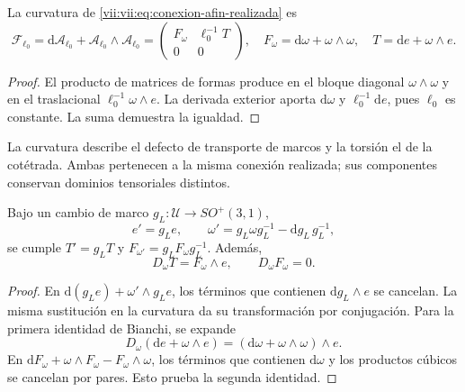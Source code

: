 \begin{proposition}
\label{vii:vii:prop:curvatura-afin}
La curvatura de \eqref{vii:vii:eq:conexion-afin-realizada} es
\begin{equation}
 \mathcal F_{\ell_0}
 =\mathrm d\mathcal A_{\ell_0}
   +\mathcal A_{\ell_0}\wedge\mathcal A_{\ell_0}
 =\begin{pmatrix}F_\omega&\ell_0^{-1}T\\0&0\end{pmatrix},
 \quad F_\omega=\mathrm d\omega+\omega\wedge\omega,
 \quad T=\mathrm de+\omega\wedge e.
 \label{vii:vii:eq:curvatura-afin-realizada}
\end{equation}
\end{proposition}
\begin{proof}
El producto de matrices de formas produce en el bloque diagonal
\(\omega\wedge\omega\) y en el traslacional
\(\ell_0^{-1}\omega\wedge e\). La derivada exterior aporta
\(\mathrm d\omega\) y \(\ell_0^{-1}\mathrm de\), pues
\(\ell_0\) es constante. La suma demuestra la igualdad.
\end{proof}

La curvatura describe el defecto de transporte de marcos y la torsión
el de la cotétrada. Ambas pertenecen a la misma conexión realizada;
sus componentes conservan dominios tensoriales distintos.

\begin{proposition}
\label{vii:vii:prop:bianchi-cartan}
Bajo un cambio de marco \(g_L:\mathcal U\to SO^+(3,1)\),
\[
 e'=g_Le,\qquad
 \omega'=g_L\omega g_L^{-1}-\mathrm dg_L\,g_L^{-1},
\]
se cumple \(T'=g_LT\) y \(F_{\omega'}=g_LF_\omega g_L^{-1}\).
Además,
\begin{equation}
 D_\omega T=F_\omega\wedge e,\qquad D_\omega F_\omega=0.
 \label{vii:vii:eq:bianchi-realizacion}
\end{equation}
\end{proposition}
\begin{proof}
En \(\mathrm d(g_Le)+\omega'\wedge g_Le\), los términos
que contienen \(\mathrm dg_L\wedge e\) se cancelan.
La misma sustitución en la curvatura da su transformación por
conjugación. Para la primera identidad de Bianchi, se expande
\[
 D_\omega(\mathrm de+\omega\wedge e)
 =(\mathrm d\omega+\omega\wedge\omega)\wedge e.
\]
En \(\mathrm dF_\omega+\omega\wedge F_\omega-F_\omega\wedge\omega\),
los términos que contienen \(\mathrm d\omega\) y los productos
cúbicos se cancelan por pares. Esto prueba la segunda identidad.
\end{proof}

